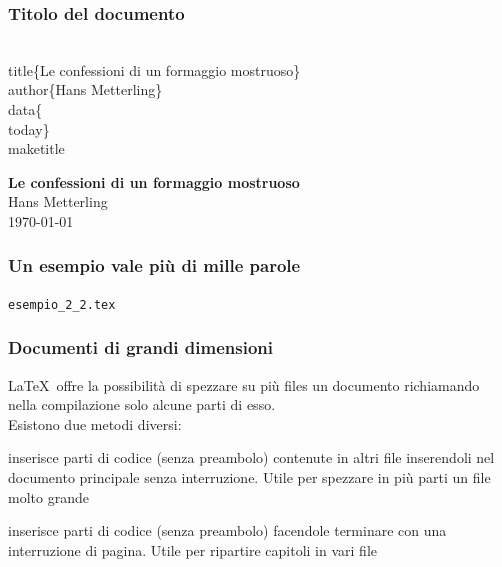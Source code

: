 \documentclass[svgnames,%
	ucs,%
	pdftex]{guitbeamer}
\begin{document}
\begin{frame}
  \frametitle{Titolo del documento}
	\begin{LaTeXcode}
		\\title\{\alert{Le confessioni di un formaggio mostruoso}\}\n
		\\author\{\alert{Hans Metterling}\}\n
		\\data\{\alert{\\today}\}\n\n
		\\maketitle
	\end{LaTeXcode}
	\begin{LaTeXoutput}\centering
		\textbf{\Large Le confessioni di un formaggio mostruoso}\\
	  \medskip
		Hans Metterling\\
	  \smallskip
		\today
	\end{LaTeXoutput}
\end{frame}
\begin{frame}
  \frametitle{Un esempio vale pi\`u di mille parole}
	\begin{center}
		\alert{\texttt{esempio\_2\_2.tex}}
	\end{center}
\end{frame}
\begin{frame}
  \frametitle{Documenti di grandi dimensioni}
	\LaTeX\ offre la possibilit\`a di spezzare su pi\`u files un documento richiamando nella compilazione solo alcune parti di esso.\\
	Esistono due metodi diversi:
  \medskip
	\begin{LaTeXcode}
		\\{\alert{<nome-file>}\}
	\end{LaTeXcode}
	inserisce parti di codice (senza preambolo) contenute in altri file inserendoli nel documento principale senza interruzione. Utile per spezzare in pi\`u parti un file molto grande 
	\begin{LaTeXcode}
		\\{\alert{<nome-file>}\}
	\end{LaTeXcode}
	inserisce parti di codice (senza preambolo) facendole terminare con una interruzione di pagina. Utile per ripartire capitoli in vari file 
\end{frame}
\end{document}
